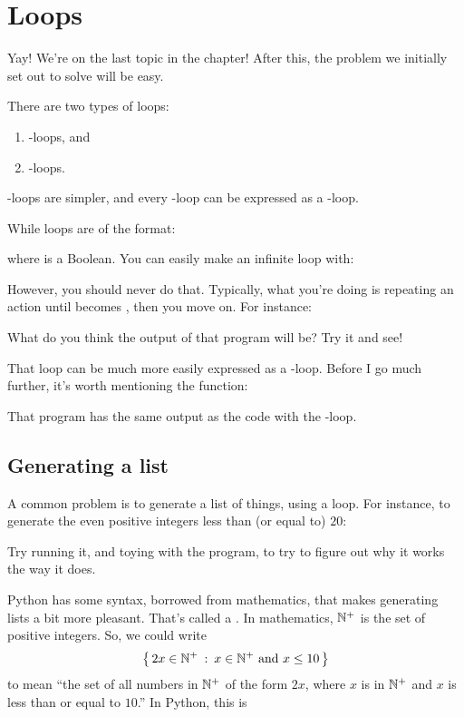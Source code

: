\section{Loops}

Yay! We're on the last topic in the chapter! After this, the problem
we initially set out to solve will be easy.

There are two types of loops:

\begin{enumerate}
\item {}-loops, and
\item {}-loops.
\end{enumerate}

-loops are simpler, and every -loop can be
expressed as a -loop.

While loops are of the format:


where  is a Boolean. You can easily make an infinite loop
with:


However, you should never do that. Typically, what you're doing is
repeating an action until  becomes \False, then you move
on. For instance:


What do you think the output of that program will be? Try it and see!

That loop can be much more easily expressed as a
-loop. Before I go much further, it's worth mentioning the
 function:


That program has the same output as the code with the
-loop.

\subsection{Generating a list}

A common problem is to generate a list of things, using a loop. For
instance, to generate the even positive integers less than (or equal
to) $20$:


Try running it, and toying with the program, to try to figure out why
it works the way it does.

Python has some syntax, borrowed from mathematics, that makes
generating lists a bit more pleasant. That's called a
. In mathematics, $\mathbb{N^{+}}$ is the set of positive
integers. So, we could write
$$\left\{\, 2x \in \mathbb{N^{+}} \::\: x \in \mathbb{N^{+}} \text{ and } x \le 10 \,\right\}$$ to mean ``the
set of all numbers in $\mathbb{N^{+}}$ of the form $2x$, where $x$ is in $\mathbb{N^{+}}$
and $x$ is less than or equal to $10$.'' In Python, this is

